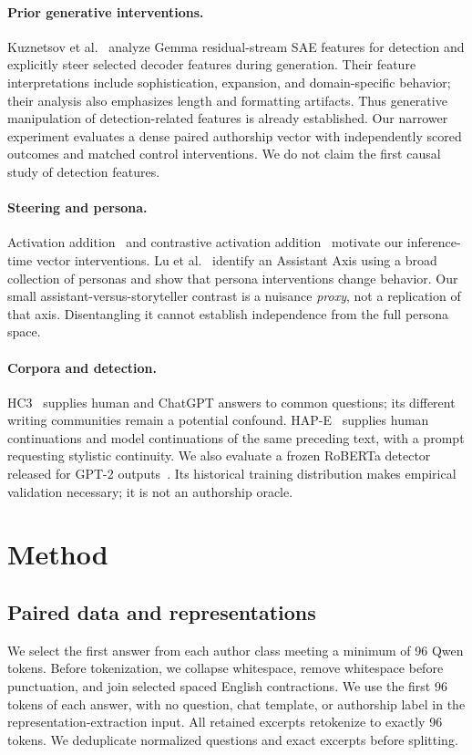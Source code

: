 \documentclass[10pt,twocolumn]{article}
\begin{document}
\paragraph{Prior generative interventions.} Kuznetsov et al.~\cite{kuznetsov2025} analyze Gemma residual-stream SAE features for detection and explicitly steer selected decoder features during generation. Their feature interpretations include sophistication, expansion, and domain-specific behavior; their analysis also emphasizes length and formatting artifacts. Thus generative manipulation of detection-related features is already established. Our narrower experiment evaluates a dense paired authorship vector with independently scored outcomes and matched control interventions. We do not claim the first causal study of detection features.

\paragraph{Steering and persona.} Activation addition~\cite{turner2023} and contrastive activation addition~\cite{rimsky2023} motivate our inference-time vector interventions. Lu et al.~\cite{lu2026} identify an Assistant Axis using a broad collection of personas and show that persona interventions change behavior. Our small assistant-versus-storyteller contrast is a nuisance \emph{proxy}, not a replication of that axis. Disentangling it cannot establish independence from the full persona space.

\paragraph{Corpora and detection.} HC3~\cite{guo2023} supplies human and ChatGPT answers to common questions; its different writing communities remain a potential confound. HAP-E~\cite{reinhart2024} supplies human continuations and model continuations of the same preceding text, with a prompt requesting stylistic continuity. We also evaluate a frozen RoBERTa detector released for GPT-2 outputs~\cite{solaiman2019}. Its historical training distribution makes empirical validation necessary; it is not an authorship oracle.

\section{Method}
\subsection{Paired data and representations}
We select the first answer from each author class meeting a minimum of 96 Qwen tokens. Before tokenization, we collapse whitespace, remove whitespace before punctuation, and join selected spaced English contractions. We use the first 96 tokens of each answer, with no question, chat template, or authorship label in the representation-extraction input. All retained excerpts retokenize to exactly 96 tokens. We deduplicate normalized questions and exact excerpts before splitting.
\end{document}

